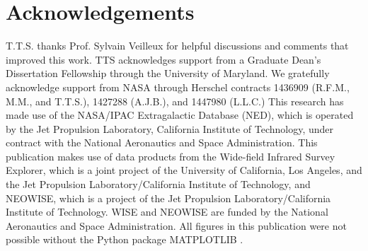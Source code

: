 \documentclass[fleqn, usenatbib]{mnras}
\begin{document}
\section*{Acknowledgements}
T.T.S. thanks Prof. Sylvain Veilleux for helpful discussions and comments that improved this work. TTS acknowledges support from a Graduate Dean's Dissertation Fellowship through the University of Maryland. We gratefully acknowledge support from NASA through Herschel contracts 1436909 (R.F.M., M.M., and T.T.S.), 1427288 (A.J.B.), and 1447980 (L.L.C.) This research has made use of the NASA/IPAC Extragalactic Database (NED), which is operated by the Jet Propulsion Laboratory, California Institute of Technology, under contract with the National Aeronautics and Space Administration. This publication makes use of data products from the Wide-field Infrared Survey Explorer, which is a joint project of the University of California, Los Angeles, and the Jet Propulsion Laboratory/California Institute of Technology, and NEOWISE, which is a project of the Jet Propulsion Laboratory/California Institute of Technology. WISE and NEOWISE are funded by the National Aeronautics and Space Administration. All figures in this publication were not possible without the Python package \textsc{MATPLOTLIB} \citep{Hunter:2007}. 






\appendix
\end{document}

